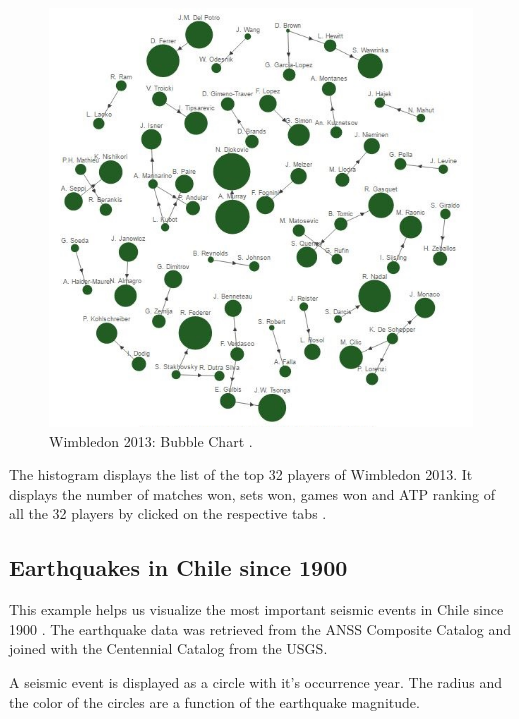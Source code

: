 \documentclass[9pt,twocolumn,twoside]{../../styles/osajnl}
\begin{document}
\begin{figure}[h]
\centering
\includegraphics[scale=0.3]{images/2}
\centering
\caption{Wimbledon 2013: Bubble Chart \cite{www-bubble}.}
\end{figure}
The histogram
displays the list of the top 32 players of Wimbledon 2013. It displays the number of matches won, sets won, games won and ATP ranking of all the 32 players by clicked on the respective tabs \cite{www-hist}.

\subsection{Earthquakes in Chile since 1900}
This example helps us visualize the most important seismic events in Chile since 1900 \cite{www-map}. The earthquake data was retrieved from the ANSS Composite Catalog and joined with the Centennial Catalog from the USGS.

 A seismic event is displayed as a circle with it's occurrence year. The radius and the color of the circles are a function of the earthquake magnitude.
\end{document}
